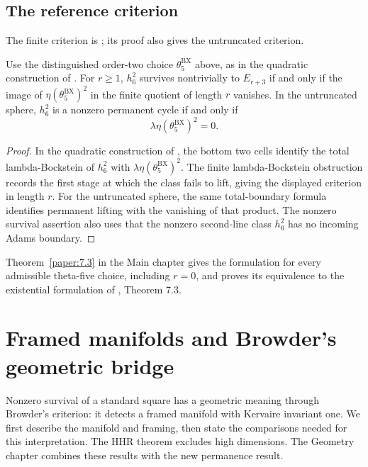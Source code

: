 \subsection{The reference criterion}

\begin{theorem}
\label{sem:Literature:bx-survival}
The finite criterion is \cite[Proposition 7.19]{BurklundXu}; its proof
also gives the untruncated criterion.\par

Use the distinguished order-two choice $\theta_5^{\mathrm{BX}}$ above,
as in the quadratic construction of \cite{BurklundXu}. For $r\ge1$, $h_6^2$ survives nontrivially to $E_{r+3}$ if and only if the image of $\eta(\theta_5^{\mathrm{BX}})^2$ in the finite quotient of length $r$ vanishes. In the untruncated sphere, $h_6^2$ is a nonzero permanent cycle if and only if
\[\lambda\eta(\theta_5^{\mathrm{BX}})^2=0.\]


\end{theorem}
\begin{proof}
In the quadratic construction of \cite{BurklundXu}, the bottom two
cells identify the total lambda-Bockstein of $h_6^2$ with
$\lambda\eta(\theta_5^{\mathrm{BX}})^2$.
The finite lambda-Bockstein obstruction records the first stage at which
the class fails to lift, giving the displayed criterion in length $r$.
For the untruncated sphere, the same total-boundary formula identifies
permanent lifting with the vanishing of that product. The nonzero
survival assertion also uses that the nonzero second-line class $h_6^2$ has
no incoming Adams boundary.
\end{proof}

Theorem~\ref{paper:7.3} in the Main chapter gives the formulation for
every admissible theta-five choice, including $r=0$, and proves its
equivalence to the existential formulation of \cite{LWX126}, Theorem 7.3.

\section{Framed manifolds and Browder's geometric bridge}
Nonzero survival of a standard square has a geometric meaning through
Browder's criterion: it detects a framed manifold with Kervaire invariant
one. We first describe the manifold and framing, then state the
comparisons needed for this interpretation. The HHR theorem excludes
high dimensions. The Geometry chapter combines these results with the
new permanence result.

